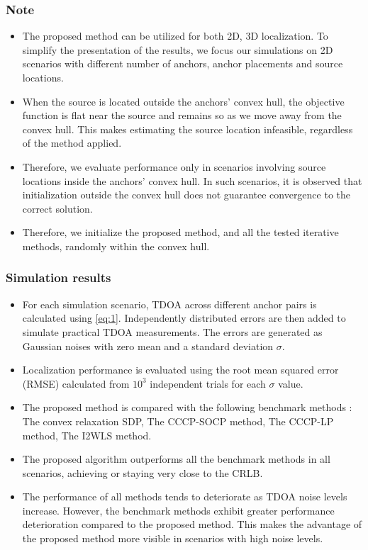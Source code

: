 \documentclass{beamer}
\begin{document}
\begin{frame} 
\frametitle{Note} 
\begin{itemize}
    \item The proposed method can be utilized for both 2D, 3D localization. To simplify the presentation of the results, we focus our simulations on 2D scenarios with different number of anchors, anchor placements and source locations.
    \item When the source is located outside the anchors’ convex hull, the objective function is flat near the source and remains so as we move away from the convex hull. This makes estimating the source location infeasible, regardless of the method applied.
    \item Therefore, we evaluate performance only in scenarios involving source locations inside the anchors’ convex hull. In such scenarios, it is observed that initialization outside the convex hull does not guarantee convergence to the correct solution.
    \item Therefore, we initialize the proposed method, and all the tested iterative methods, randomly within the convex hull.
\end{itemize}
\end{frame}

\begin{frame} 
\frametitle{Simulation results} 
\begin{itemize}
    \item For each simulation scenario, TDOA across different anchor pairs is calculated using \eqref{eq:1}. Independently distributed errors are then added to simulate practical TDOA measurements. The errors are generated as Gaussian noises with zero mean and a standard deviation $\sigma$.
    \item  Localization performance is evaluated using the root mean squared error (RMSE) calculated from $10^{3}$ independent trials for each $\sigma$ value.
    \item The proposed method is compared with the following benchmark methods : The convex relaxation SDP, The CCCP-SOCP method, The CCCP-LP method, The I2WLS method.
    \item The proposed algorithm outperforms all the benchmark methods in all scenarios, achieving or staying very close to the CRLB.
    \item The performance of all methods tends to deteriorate as TDOA noise levels increase. However, the benchmark methods exhibit greater performance deterioration compared to the proposed method. This makes the advantage of the proposed method more visible in scenarios with high noise levels.
    
\end{itemize}
\end{frame}
\end{document}
